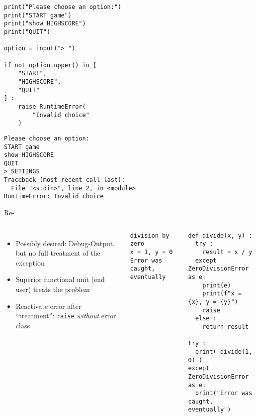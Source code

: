 \begin{frame}[fragile]
%
\begin{tcbraster}[raster columns=2,
                  raster equal height,
                  nobeforeafter,
                  raster column skip=0.5cm]
\begin{codebox}
\begin{verbatim}
print("Please choose an option:")
print("START game")
print("show HIGHSCORE")
print("QUIT")

option = input("> ")

if not option.upper() in [
    "START",
    "HIGHSCORE",
    "QUIT"
] :
    raise RuntimeError(
        "Invalid choice"
    )
\end{verbatim}
\end{codebox}
%
\begin{cmdbox}
\begin{verbatim}
Please choose an option:
START game
show HIGHSCORE
QUIT
> SETTINGS
Traceback (most recent call last):
  File "<stdin>", line 2, in <module>
RuntimeError: Invalid choice
\end{verbatim}
\end{cmdbox}
\end{tcbraster}
%
\end{frame}


\begin{frame}[fragile]{Re-}
%
\begin{columns}[T]
\begin{itemize}
\item Possibly desired: Debug-Output, but no full treatment of the exception
\item Superior functional unit (end user) treats the problem
\item[\Thus] Reactivate error after \enquote{treatment}: \texttt{raise} \emph{without} error class
\end{itemize}
%
\vspace{15pt}
\begin{cmdbox}
\begin{verbatim}
division by zero
x = 1, y = 0
Error was caught, eventually
\end{verbatim}
\end{cmdbox}
%
\begin{codebox}
\begin{verbatim}
def divide(x, y) :
  try :
    result = x / y
  except ZeroDivisionError as e:
    print(e)
    print(f"x = {x}, y = {y}")
    raise
  else :
    return result

try :
  print( divide(1, 0) )
except ZeroDivisionError as e:
  print("Error was caught, eventually")
\end{verbatim}
\end{codebox}
%
\end{columns}
%
\end{frame}

